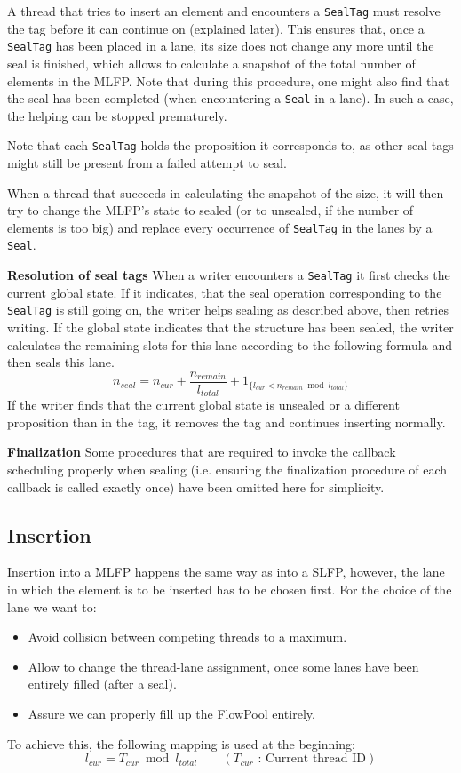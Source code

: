 \documentclass[runningheads,a4paper,fleqn]{llncs}
\begin{document}
A thread that tries to insert an element and encounters a
\verb+SealTag+ must resolve the tag before it can continue on
(explained later). This ensures that, once a \verb+SealTag+ has been
placed in a lane, its size does not change any more until the seal is
finished, which allows to calculate a snapshot of the total number of
elements in the MLFP. Note that during this procedure, one might also
find that the seal has been completed (when encountering a \verb+Seal+
in a lane). In such a case, the helping can be stopped prematurely.

Note that each \verb+SealTag+ holds the proposition it corresponds to,
as other seal tags might still be present from a failed attempt to
seal.

When a thread that succeeds in calculating the snapshot of the size,
it will then try to change the MLFP's state to sealed (or to unsealed,
if the number of elements is too big) and replace every occurrence of
\verb+SealTag+ in the lanes by a \verb+Seal+.

\textbf{Resolution of seal tags} When a writer encounters a
\verb+SealTag+ it first checks the current global state. If it
indicates, that the seal operation corresponding to the \verb+SealTag+
is still going on, the writer helps sealing as described above, then
retries writing. If the global state indicates that the structure has
been sealed, the writer calculates the remaining slots for this lane
according to the following formula and then seals this lane.
\[ n_{seal} = n_{cur} + \frac{n_{remain}}{l_{total}} +
   1_{\{ l_{cur} < n_{remain} \bmod l_{total} \}} \]
If the writer finds that the current global state is unsealed or a
different proposition than in the tag, it removes the tag and
continues inserting normally.

\textbf{Finalization} Some procedures that are required to invoke the
callback scheduling properly when sealing (i.e. ensuring the
finalization procedure of each callback is called exactly once) have
been omitted here for simplicity.

\subsection{Insertion}
Insertion into a MLFP happens the same way as into a SLFP, however,
the lane in which the element is to be inserted has to be chosen
first. For the choice of the lane we want to:
\begin{itemize}
\item Avoid collision between competing threads to a maximum.
\item Allow to change the thread-lane assignment, once some lanes have
  been entirely filled (after a seal).
\item Assure we can properly fill up the FlowPool entirely.
\end{itemize}
To achieve this, the following mapping is used at the beginning:
\[ l_{cur} = T_{cur} \bmod l_{total} \qquad
  (T_{cur} \text{ : Current thread ID}) \] 
\end{document}
